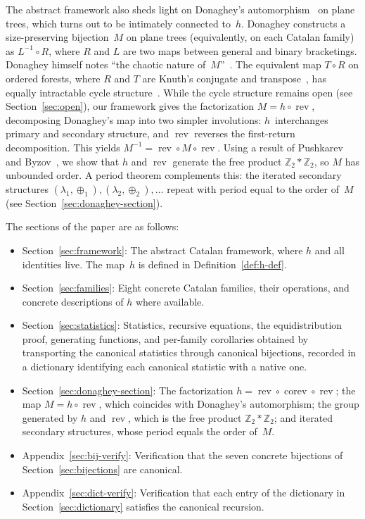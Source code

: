 \documentclass[a4paper,11pt]{article}
\theoremstyle{definition}
\DeclareMathOperator{\rev}{rev}
\DeclareMathOperator{\corev}{corev}
\begin{document}
The abstract framework also sheds light on Donaghey's
automorphism~\cite{Donaghey80} on plane trees, which turns out to be intimately
connected to~$h$.  Donaghey constructs a size-preserving bijection~$M$ on
plane trees (equivalently, on each Catalan family) as $L^{-1} \circ R$, where
$R$ and $L$ are two maps between general and binary bracketings.  Donaghey
himself notes ``the chaotic nature of~$M$''~\cite{Donaghey80}.
The equivalent map $T \circ R$ on ordered forests, where $R$ and $T$ are Knuth's
conjugate and transpose~\cite[Ex.~17, \S7.2.1.6]{Knuth06}, has equally
intractable cycle structure~\cite{Callan07}.  While the cycle structure remains
open (see Section~\ref{sec:open}), our framework gives the factorization
$M = h \circ \rev$, decomposing Donaghey's map into two simpler
involutions: $h$~interchanges primary and secondary structure, and
$\rev$ reverses the first-return decomposition.  This yields
$M^{-1} = \rev \circ M \circ \rev$.  Using a result of Pushkarev and
Byzov~\cite{PushkarevByzov14}, we show that $h$ and $\rev$ generate the free
product $\mathbb{Z}_2 * \mathbb{Z}_2$, so $M$ has unbounded order.  A period
theorem complements this: the iterated secondary structures
$(\lambda_1, \oplus_1), (\lambda_2, \oplus_2), \ldots$ repeat with period equal
to the order of~$M$ (see Section~\ref{sec:donaghey-section}).

The sections of the paper are as follows:
\begin{itemize}
\item Section~\ref{sec:framework}: The abstract Catalan framework, where $h$ and all
identities live.  The map~$h$ is defined in Definition~\ref{def:h-def}.
\item Section~\ref{sec:families}: Eight concrete Catalan families, their operations,
  and concrete descriptions of $h$ where available.
\item Section~\ref{sec:statistics}: Statistics, recursive equations, the
  equidistribution proof, generating functions, and per-family
  corollaries obtained by transporting the canonical statistics
  through canonical bijections, recorded in a dictionary identifying
  each canonical statistic with a native one.
\item Section~\ref{sec:donaghey-section}: The factorization
  $h = \rev \circ \corev \circ \rev$; the map
  $M = h \circ \rev$, which coincides with Donaghey's
  automorphism; the group generated by $h$ and $\rev$, which is the
  free product $\mathbb{Z}_2 * \mathbb{Z}_2$; and iterated secondary
  structures, whose period equals the order of~$M$.
\item Appendix~\ref{sec:bij-verify}: Verification that the seven concrete
  bijections of Section~\ref{sec:bijections} are canonical.
\item Appendix~\ref{sec:dict-verify}: Verification that each entry of the
  dictionary in Section~\ref{sec:dictionary} satisfies the canonical recursion.
\end{itemize}
\end{document}
